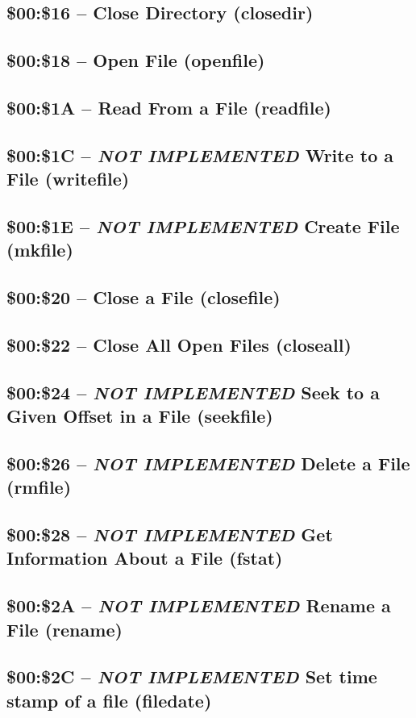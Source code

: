 \subsection{\$00:\$16 -- Close Directory (closedir)}
\subsection{\$00:\$18 -- Open File (openfile)}
\subsection{\$00:\$1A -- Read From a File (readfile)}
\subsection{\$00:\$1C -- {\em NOT IMPLEMENTED} Write to a File (writefile)}
\subsection{\$00:\$1E -- {\em NOT IMPLEMENTED} Create File (mkfile)}

\subsection{\$00:\$20 -- Close a File (closefile)}
\subsection{\$00:\$22 -- Close All Open Files (closeall)}
\subsection{\$00:\$24 -- {\em NOT IMPLEMENTED} Seek to a Given Offset in a File (seekfile)}
\subsection{\$00:\$26 -- {\em NOT IMPLEMENTED} Delete a File (rmfile)}
\subsection{\$00:\$28 -- {\em NOT IMPLEMENTED} Get Information About a File (fstat)}
\subsection{\$00:\$2A -- {\em NOT IMPLEMENTED} Rename a File (rename)}
\subsection{\$00:\$2C -- {\em NOT IMPLEMENTED} Set time stamp of a file (filedate)}
